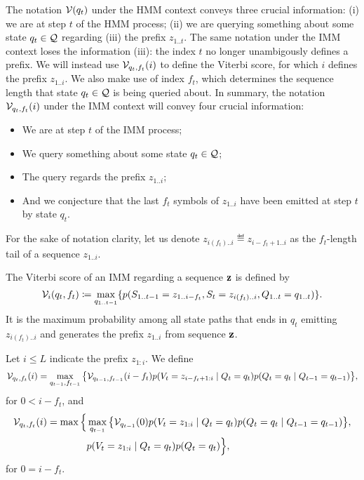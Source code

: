 The notation $\mathcal{V}(q_t)$ under the HMM context conveys three crucial information: (i) we are at
step $t$ of the HMM process; (ii) we are querying something about some state $q_t \in \mathcal{Q}$
regarding (iii) the prefix $z_{1..t}$. The same notation under the IMM context loses the information
(iii): the index $t$ no longer unambigously defines a prefix. We will instead use
$\mathcal{V}_{q_t,f_t}(i)$ to define the Viterbi score, for which $i$ defines the prefix $z_{1..i}$. We
also make use of index $f_t$, which determines the sequence length that state $q_t \in \mathcal{Q}$ is
being queried about.
In summary, the notation $\mathcal{V}_{q_t,f_t}(i)$ under the IMM context will convey four crucial
information:
\begin{itemize}
  \item We are at step $t$ of the IMM process;
  \item We query something about some state $q_t \in \mathcal{Q}$;
  \item The query regards the prefix $z_{1..i}$;
  \item And we conjecture that the last $f_t$ symbols of $z_{1..i}$ have been emitted at step $t$ by
    state $q_t$.
\end{itemize}
For the sake of notation clarity, let us denote $z_{i(f_t)..i} \eqdef z_{i-f_t+1..i}$ as the
$f_t$-length tail of a sequence $z_{1..i}$.

The Viterbi score of an IMM regarding a sequence $\mathbf{z}$ is defined by
\begin{equation*}
  \mathcal{V}_{i}(q_t,f_t) \coloneqq \underset{q_{1..t-1}}{\max} \{ p(S_{1..{t-1}}=z_{1..{i-f_t}},
                                                    S_t=z_{i(f_t)..i}, Q_{1..t}=q_{1..t}) \}.
\end{equation*}
It is the maximum probability among all state paths that ends in
$q_t$ emitting $z_{i(f_t)..i}$ and generates the prefix $z_{1..i}$ from sequence $\mathbf{z}$.

Let $i \leq L$ indicate the prefix $z_{1:i}$.
We define
\begin{align*}
  \mathcal{V}_{q_t,f_t}(i) =
  \max_{q_{t-1}, f_{t-1}}
  \big\{
    \mathcal{V}_{q_{t-1},f_{t-1}}(i-f_t) p(V_t=z_{i-f_t+1:i} \;|\; Q_t=q_t) p(Q_t=q_t \;|\;
    Q_{t-1}=q_{t-1})
  \big\},
\end{align*}
for $0 < i - f_t$,
and
\begin{align*}
  \mathcal{V}_{q_t,f_t}(i) =
  \max
  \Big\{
    &\max_{q_{t-1}}
    \big\{
      \mathcal{V}_{q_{t-1}}(0) p(V_t=z_{1:i} \;|\; Q_t=q_t) p(Q_t=q_t \;|\;
      Q_{t-1}=q_{t-1})
    \big\},\\
    &p(V_t=z_{1:i} \;|\; Q_t=q_t) p(Q_t=q_t)
  \Big\},
\end{align*}
for $0 = i - f_t$.

